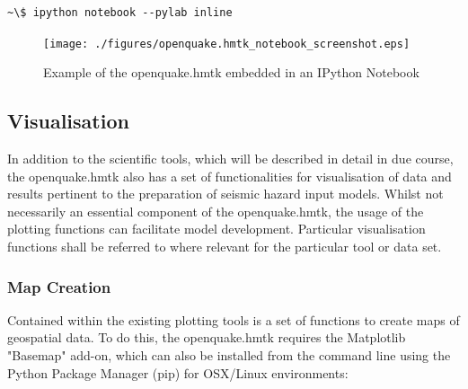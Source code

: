 \begin{Verbatim}[frame=single, commandchars=\\\{\}, fontsize=\scriptsize]
~\$ ipython notebook --pylab inline
\end{Verbatim}

\begin{figure}[htb]
  \centering
      \texttt{[image: ./figures/openquake.hmtk\_notebook\_screenshot.eps]}
  \caption{Example of the openquake.hmtk embedded in an IPython Notebook}
  \label{fig:notebook}
\end{figure}


%
%

\subsection{Visualisation}

In addition to the scientific tools, which will be described in detail in due course, the openquake.hmtk also has a set of functionalities for visualisation of data and results pertinent to the preparation of seismic hazard input models. Whilst not necessarily an essential component of the openquake.hmtk, the usage of the plotting functions can facilitate model development. Particular visualisation functions shall be referred to where relevant for the particular tool or data set. 

\subsubsection{Map Creation}

Contained within the existing plotting tools is a set of functions to create maps of geospatial data. To do this, the openquake.hmtk requires the Matplotlib "Basemap" add-on, which can also be installed from the command line using the Python Package Manager (pip) for OSX/Linux environments:

